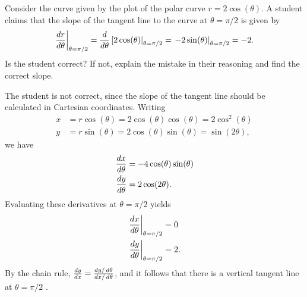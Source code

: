 \documentclass[noauthor,handout]{ximera}
\begin{document}
\begin{problem}
Consider the curve given by the plot of the polar curve $r = 2 \cos(\theta)$. A student claims that the slope of the tangent line to the curve at $\theta = \pi/2$ is given by
$$
\left.\frac{\mathop{}\!d r}{\mathop{}\!d \theta}\right|_{\theta = \pi/2} =  \frac{\mathop{}\!d}{\mathop{}\!d \theta }  \left[2 \cos(\theta) \right|_{\theta = \pi/2}=  \left. -2 \sin(\theta) \right|_{\theta = \pi/2} = -2.
$$
Is the student correct? If not, explain the mistake in their reasoning and find the correct slope.
\begin{freeResponse}
The student is not correct, since the slope of the tangent line should be calculated in Cartesian coordinates. Writing
\begin{align*}
x &= r \cos(\theta) = 2 \cos(\theta) \cos(\theta) = 2 \cos^2(\theta) \\
y &= r \sin(\theta) = 2 \cos(\theta) \sin(\theta) =  \sin(2 \theta),
\end{align*}
we have
\begin{align*}
\frac{\mathop{}\!d x}{\mathop{}\!d \theta} &= -4 \cos (\theta)\sin(\theta) \\
\frac{\mathop{}\!d y}{\mathop{}\!d \theta} &= 2 \cos(2\theta).
\end{align*}
Evaluating these derivatives at $\theta = \pi/2$ yields
\begin{align*}
\left.\frac{\mathop{}\!d x}{\mathop{}\!d \theta}\right|_{\theta = \pi/2} &= 0 \\
\left.\frac{\mathop{}\!d y}{\mathop{}\!d \theta}\right|_{\theta = \pi/2} &= 2.
\end{align*}
By the chain rule, $\frac{\mathop{}\!d y}{\mathop{}\!d x} = \frac{\mathop{}\!d y/ \mathop{}\!d \theta}{\mathop{}\!d x/ \mathop{}\!d \theta}$, and it follows that there is a vertical tangent line at $\theta = \pi/2$ . 
\end{freeResponse}
\end{problem}
\end{document}
